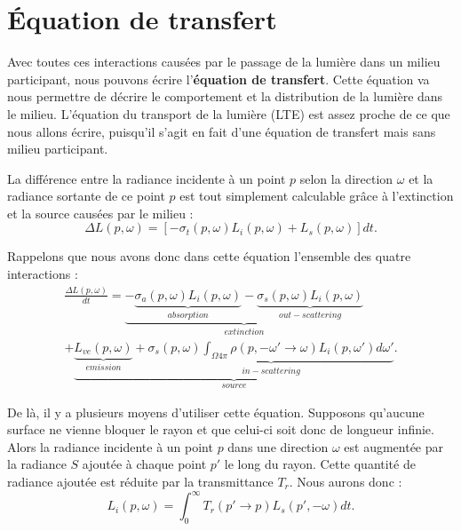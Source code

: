 \chapter{Équation de transfert}

Avec toutes ces interactions causées par le passage de la lumière dans un milieu participant, nous pouvons écrire l'\textbf{équation de transfert}. Cette équation va nous permettre de décrire le comportement et la distribution de la lumière dans le milieu. L'équation du transport de la lumière (LTE) est assez proche de ce que nous allons écrire, puisqu'il s'agit en fait d'une équation de transfert mais sans milieu participant.\newline\par

La différence entre la radiance incidente à un point $p$ selon la direction $\omega$  et la radiance sortante de ce point $p$ est tout simplement calculable grâce à l'extinction et la source causées par le milieu :
\large \begin{equation}
    \Delta L(p, \omega) = [-\sigma_{t}(p, \omega)L_{i}(p, \omega) + L_s(p, \omega)]dt
.\end{equation} \normalsize
\par

Rappelons que nous avons donc dans cette équation l'ensemble des quatre interactions :
\large \begin{multline}
    \frac{\Delta L(p, \omega)}{dt} =
        \underbrace{-
            \underbrace{\sigma_{a}(p, \omega)L_{i}(p, \omega)}_{absorption}-
            \underbrace{\sigma_{s}(p, \omega)L_{i}(p, \omega)}_{out-scattering}}
        _{extinction}
        \\ +
        \underbrace{
            \underbrace{L_{ve}(p, \omega)}_{emission}+
            \underbrace{\sigma_{s}(p, \omega) \int_{\Omega4\pi}\rho(p, -\omega'\longrightarrow\omega)L_i(p, \omega')d\omega'}_{in-scattering}}
        _{source}
.\end{multline}
\normalsize\newline\par

De là, il y a plusieurs moyens d'utiliser cette équation. Supposons qu'aucune surface ne vienne bloquer le rayon et que celui-ci soit donc de longueur infinie. Alors la radiance incidente à un point $p$ dans une direction $\omega$ est augmentée par la radiance $S$ ajoutée à chaque point $p'$ le long du rayon. Cette quantité de radiance ajoutée est réduite par la transmittance $T_{r}$. Nous aurons donc :
\large \begin{equation*}
L_{i}(p, \omega) = \int_{0}^{\infty} T_{r}(p'\longrightarrow p)L_s(p', -\omega) dt.
\end{equation*} \normalsize \newline\par

